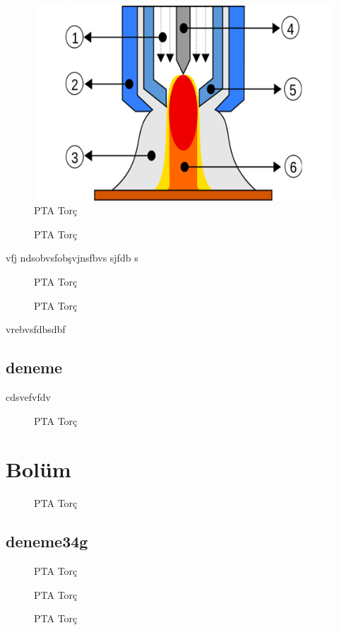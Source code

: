 \begin{figure}[htp]
\includegraphics[width=\textwidth]{gorseller/ptaTorc}
\caption{PTA Torç}\label{fig:PtaTorc10}
\end{figure}
\begin{figure}[htp]
\caption{PTA Torç}\label{fig:PtaTorc11}
\end{figure}


vfj ndsobvsfobşvjnsfbvs
 sjfdb s
\lipsum 

\begin{figure}[htp]
\caption{PTA Torç}\label{fig:PtaTorc12}
\end{figure}
\begin{figure}[htp]
\caption{PTA Torç}\label{fig:PtaTorc13}
\end{figure}

vrebvsfdbsdbf

\section{deneme}

cdsvefvfdv
\begin{figure}[htp]
\caption{PTA Torç}\label{fig:PtaTorc14}
\end{figure}
\chapter{Bolüm}
\begin{figure}[htp]
\caption{PTA Torç}\label{fig:PtaTorc15}
\end{figure}
\section{deneme34g}
\begin{figure}[htp]
\caption{PTA Torç}\label{fig:PtaTorc16}
\end{figure}
\begin{figure}[htp]
\caption{PTA Torç}\label{fig:PtaTorc17}
\end{figure}

\begin{figure}[htp]
\caption{PTA Torç}\label{fig:PtaTorc18}
\end{figure}